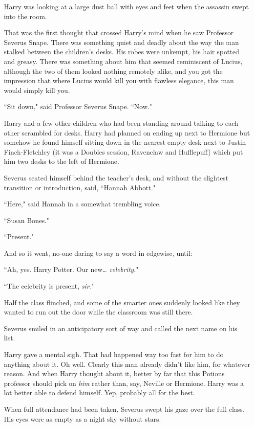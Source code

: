Harry was looking at a large dust ball with eyes and feet when the assassin swept into the room.

That was the first thought that crossed Harry's mind when he saw Professor Severus Snape. There was something quiet and deadly about the way the man stalked between the children's desks. His robes were unkempt, his hair spotted and greasy. There was something about him that seemed reminiscent of Lucius, although the two of them looked nothing remotely alike, and you got the impression that where Lucius would kill you with flawless elegance, this man would simply kill you.

``Sit down," said Professor Severus Snape. ``Now."

Harry and a few other children who had been standing around talking to each other scrambled for desks. Harry had planned on ending up next to Hermione but somehow he found himself sitting down in the nearest empty desk next to Justin Finch-Fletchley (it was a Doubles session, Ravenclaw and Hufflepuff) which put him two desks to the left of Hermione.

Severus seated himself behind the teacher's desk, and without the slightest transition or introduction, said, ``Hannah Abbott."

``Here," said Hannah in a somewhat trembling voice.

``Susan Bones."

``Present."

And so it went, no-one daring to say a word in edgewise, until:

``Ah, yes. Harry Potter. Our new{\ldots} \emph{celebrity.}"

``The celebrity is present, \emph{sir}."

Half the class flinched, and some of the smarter ones suddenly looked like they wanted to run out the door while the classroom was still there.

Severus smiled in an anticipatory sort of way and called the next name on his list.

Harry gave a mental sigh. That had happened way too fast for him to do anything about it. Oh well. Clearly this man already didn't like him, for whatever reason. And when Harry thought about it, better by far that this Potions professor should pick on \emph{him} rather than, say, Neville or Hermione. Harry was a lot better able to defend himself. Yep, probably all for the best.

When full attendance had been taken, Severus swept his gaze over the full class. His eyes were as empty as a night sky without stars.

